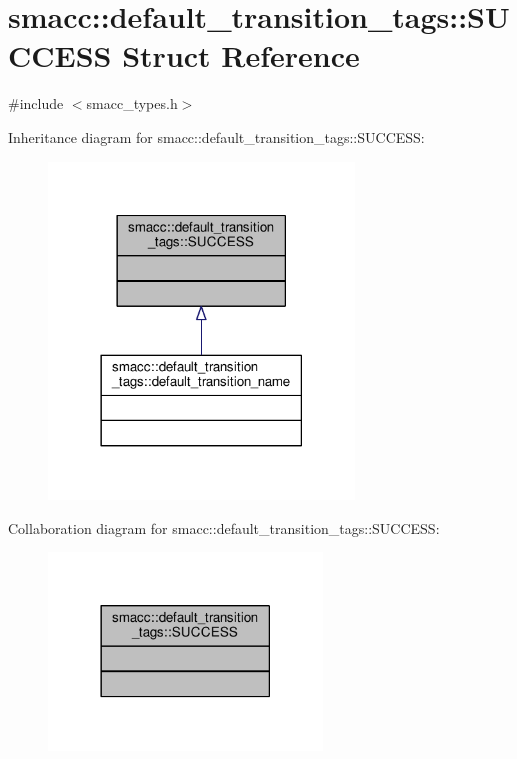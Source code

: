 \hypertarget{structsmacc_1_1default__transition__tags_1_1SUCCESS}{}\section{smacc\+:\+:default\+\_\+transition\+\_\+tags\+:\+:S\+U\+C\+C\+E\+SS Struct Reference}
\label{structsmacc_1_1default__transition__tags_1_1SUCCESS}


{\ttfamily \#include $<$smacc\+\_\+types.\+h$>$}



Inheritance diagram for smacc\+:\+:default\+\_\+transition\+\_\+tags\+:\+:S\+U\+C\+C\+E\+SS\+:\nopagebreak
\begin{figure}[H]
\begin{center}
\leavevmode
\includegraphics[width=230pt]{structsmacc_1_1default__transition__tags_1_1SUCCESS__inherit__graph}
\end{center}
\end{figure}


Collaboration diagram for smacc\+:\+:default\+\_\+transition\+\_\+tags\+:\+:S\+U\+C\+C\+E\+SS\+:\nopagebreak
\begin{figure}[H]
\begin{center}
\leavevmode
\includegraphics[width=206pt]{structsmacc_1_1default__transition__tags_1_1SUCCESS__coll__graph}
\end{center}
\end{figure}


